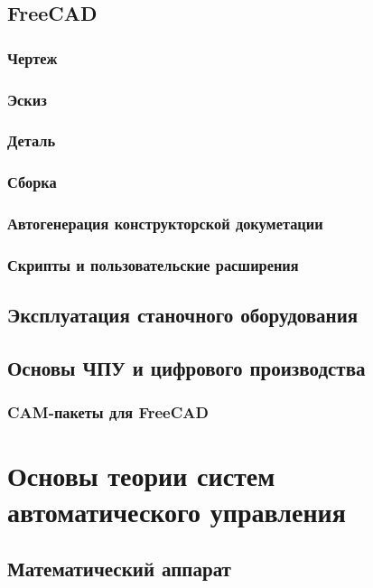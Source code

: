 \chapter{FreeCAD}

\section{Чертеж}

\section{Эскиз}

\section{Деталь}

\section{Сборка}

\section{Автогенерация конструкторской докуметации}

\section{Скрипты и пользовательские расширения}

\chapter{Эксплуатация станочного оборудования}

\chapter{Основы ЧПУ и цифрового производства}

\section{CAM-пакеты для FreeCAD}

\part{Основы теории систем автоматического управления}

\chapter{Математический аппарат}

